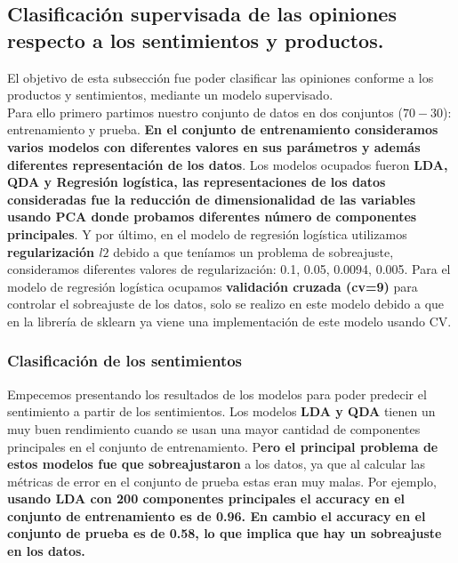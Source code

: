 \documentclass[paper=letter, fontsize=11pt]{scrartcl}
\numberwithin{equation}{section} %
\numberwithin{figure}{section} %
\numberwithin{table}{section} %
\begin{document}
\subsection{Clasificación supervisada de las opiniones respecto a los sentimientos y productos.}

El objetivo de esta subsección fue poder clasificar las opiniones conforme a los productos y sentimientos, mediante un modelo supervisado. \\

Para ello primero partimos nuestro conjunto de datos en dos conjuntos ($70-30$): entrenamiento y prueba. \textbf{En el conjunto de entrenamiento consideramos varios modelos con diferentes valores en sus parámetros y además diferentes representación de los datos}. Los modelos ocupados fueron \textbf{LDA, QDA y Regresión logística, las representaciones de los datos consideradas fue la reducción de dimensionalidad de las variables usando PCA donde probamos diferentes número de componentes principales}. Y por último, en el modelo de regresión logística utilizamos \textbf{regularización $l2$} debido a que teníamos un problema de sobreajuste, consideramos diferentes valores de regularización: 0.1, 0.05, 0.0094, 0.005. Para el modelo de regresión logística ocupamos \textbf{validación cruzada (cv=9)} para controlar el sobreajuste de los datos, solo se realizo en este modelo debido a que en la librería de sklearn ya viene una implementación de este modelo usando CV.


\subsubsection{Clasificación de los sentimientos}
Empecemos presentando los resultados de los modelos para poder predecir el sentimiento a partir de los sentimientos. Los modelos \textbf{LDA y QDA} tienen un muy buen rendimiento cuando se usan una mayor cantidad de componentes principales en el conjunto de entrenamiento. P\textbf{ero el principal problema de estos modelos fue que sobreajustaron} a los datos, ya que al calcular las métricas de error en el conjunto de prueba estas eran muy malas. Por ejemplo, \textbf{usando LDA con 200 componentes principales el accuracy en el conjunto de entrenamiento es de 0.96. En cambio el accuracy en el conjunto de prueba es de 0.58, lo que implica que hay un sobreajuste en los datos.} \\
\end{document}
